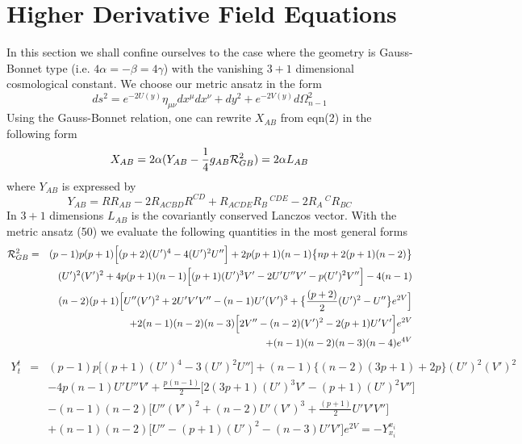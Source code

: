 \documentclass[a4paper,12pt]{article}
\newcommand {\nn} {\nonumber}
\begin{document}
\section{Higher Derivative Field Equations}
   In this section we shall confine ourselves to the case where the geometry
is Gauss-Bonnet type (i.e. $4\alpha=-\beta=4\gamma$) with the vanishing $3+1$ 
dimensional cosmological constant. We choose our metric ansatz in the form 
\begin{equation}
ds^2=e^{-2U(y)}\eta_{\mu\nu}dx^{\mu}dx^{\nu}+dy^2+e^{-2V(y)}d\Omega_{n-1}^2
\end{equation}
Using the Gauss-Bonnet relation, one can rewrite $X_{AB}$ from eqn(2) in the 
following form
\begin{equation}
X_{AB}=2\alpha(Y_{AB}-\frac{1}{4}g_{AB}{\cal R}_{GB}^2)= 2\alpha L_{AB}
\end{equation}
where $Y_{AB}$ is expressed by
\begin{equation}
Y_{AB}=R R_{AB}-2R_{ACBD}R^{CD}+R_{ACDE}R_B\,^{CDE}-2R_A\,^C R_{BC}
\end{equation}
In $3+1$ dimensions $L_{AB}$ is the covariantly conserved Lanczos vector. 
With the metric ansatz (50) we evaluate the following quantities 
in the most general forms
\begin{eqnarray}
{\cal R}_{GB}^2 &=&(p-1)p(p+1)\Big[(p+2)(U')^4 -4(U')^2 U''\Big]+2p(p+1)(n-1)
\big\{np+2(p+1)(n-2)\big\}\nn\\
&&(U')^2(V')^2+4p(p+1)(n-1)\Big[(p+1)(U')^3 V'- 2U'U''V'-p(U')^2V''\Big]
-4(n-1)\nn\\
&&(n-2)(p+1)\Big[U''(V')^2 + 2U'V'V''-(n-1)U'(V')^3 
+\big\{\frac{(p+2)}{2}(U')^2 -U''\big\}e^{2V}\Big]\nn\\
&&+2(n-1)(n-2)(n-3)\Big[2V''-(n-2)(V')^2-2(p+1)U'V'\Big] e^{2V}\nn\\
&&+(n-1)(n-2)(n-3)(n-4) e^{4V}
\end{eqnarray}
\begin{eqnarray}
Y_t^t&=&(p-1)p\Big[(p+1)(U')^4-3(U')^2U''\Big]+
(n-1)\big\{(n-2)(3p+1)+2p\big\}(U')^2(V')^2\nn\\
&&-4p(n-1)U'U''V'+\frac{p(n-1)}{2}\Big[2(3p+1)(U')^3V'-(p+1)(U')^2V''\Big]\nn\\
&&-(n-1)(n-2)\Big[U''(V')^2+(n-2)U'(V')^3+\frac{(p+1)}{2}U'V'V''\Big]\nn\\
&&+(n-1)(n-2)\Big[U''-(p+1)(U')^2-(n-3)U'V'\Big] e^{2V}=-Y_{x_i}^{x_i}
\end{eqnarray}
\end{document}
